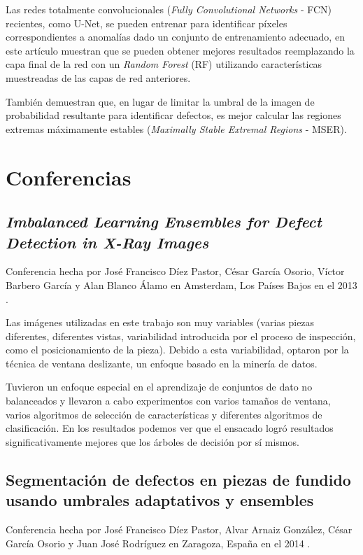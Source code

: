 Las redes totalmente convolucionales (\textit{Fully Convolutional Networks} - FCN) recientes, como U-Net, se pueden entrenar para identificar píxeles correspondientes a anomalías dado un conjunto de entrenamiento adecuado, en este artículo muestran que se pueden obtener mejores resultados reemplazando la capa final de la red con un \textit{Random Forest} (RF) utilizando características muestreadas de las capas de red anteriores.

También demuestran que, en lugar de limitar la umbral de la imagen de probabilidad resultante para identificar defectos, es mejor calcular las regiones extremas máximamente estables (\textit{Maximally Stable Extremal Regions} - MSER).

\section{Conferencias}

\subsection{\textit{Imbalanced Learning Ensembles for Defect Detection in X-Ray Images}}

Conferencia hecha por José Francisco Díez Pastor, César García Osorio, Víctor Barbero García y Alan Blanco Álamo en Amsterdam, Los Países Bajos en el 2013 \cite{ieaaieDiez-PastorGBB13}.

Las imágenes utilizadas en este trabajo son muy variables (varias piezas diferentes, diferentes vistas, variabilidad introducida por el proceso de inspección, como el posicionamiento de la pieza). Debido a esta variabilidad, optaron por la técnica de ventana deslizante, un enfoque basado en la minería de datos.

Tuvieron un enfoque especial en el aprendizaje de conjuntos de dato no balanceados y llevaron a cabo experimentos con varios tamaños de ventana, varios algoritmos de selección de características y diferentes algoritmos de clasificación. En los resultados podemos ver que el ensacado logró resultados significativamente mejores que los árboles de decisión por sí mismos.

\subsection{Segmentación de defectos en piezas de fundido usando umbrales adaptativos y ensembles}

Conferencia hecha por José Francisco Díez Pastor, Alvar Arnaiz González, César García Osorio y Juan José Rodríguez en Zaragoza, España en el 2014 \cite{ESTYLF2014a}.

